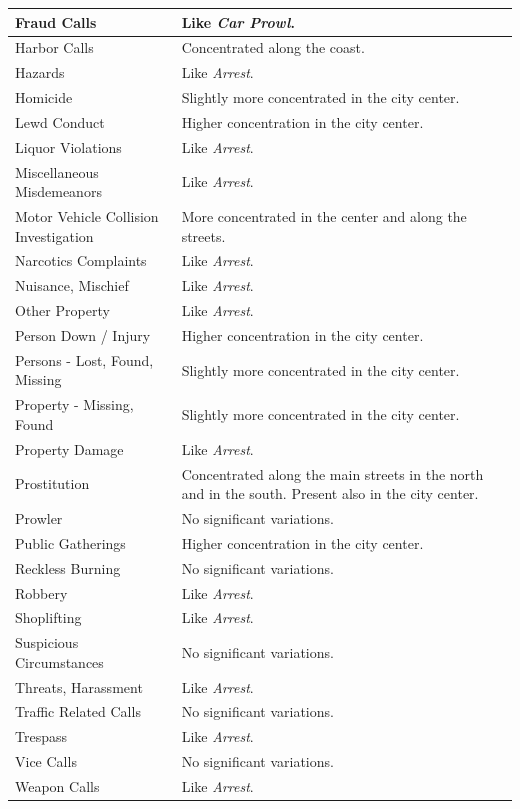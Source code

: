 \begin{longtable}{ | >{\arraybackslash} m{5cm} | >{\arraybackslash} m{10cm} | }
    \hline
    Fraud Calls             &   Like \textit{Car Prowl}. \\
    \hline
    Harbor Calls            &   Concentrated along the coast. \\
    \hline
    Hazards                 &   Like \textit{Arrest}. \\
    \hline
    Homicide                &   Slightly more concentrated in the city center. \\
    \hline
    Lewd Conduct            &   Higher concentration in the city center. \\
    \hline
    Liquor Violations       &   Like \textit{Arrest}. \\
    \hline
    Miscellaneous Misdemeanors &   Like \textit{Arrest}. \\
    \hline
    Motor Vehicle Collision Investigation &   More concentrated in the center and along the streets. \\
    \hline
    Narcotics Complaints    &   Like \textit{Arrest}. \\
    \hline
    Nuisance, Mischief      &   Like \textit{Arrest}. \\
    \hline
    Other Property          &   Like \textit{Arrest}. \\
    \hline
    Person Down / Injury    &   Higher concentration in the city center. \\
    \hline
    Persons - Lost, Found, Missing &   Slightly more concentrated in the city center. \\
    \hline
    Property - Missing, Found    &   Slightly more concentrated in the city center. \\
    \hline
    Property Damage         &   Like \textit{Arrest}. \\
    \hline
    Prostitution            &   Concentrated along the main streets in the north and in the south. Present also in the city center. \\
    \hline
    Prowler                 &   No significant variations. \\
    \hline
    Public Gatherings       &   Higher concentration in the city center. \\
    \hline
    Reckless Burning        &   No significant variations. \\
    \hline
    Robbery                 &   Like \textit{Arrest}. \\
    \hline
    Shoplifting             &   Like \textit{Arrest}. \\
    \hline
    Suspicious Circumstances &   No significant variations. \\
    \hline
    Threats, Harassment     &   Like \textit{Arrest}. \\
    \hline
    Traffic Related Calls   &   No significant variations. \\
    \hline
    Trespass                &   Like \textit{Arrest}. \\
    \hline
    Vice Calls              &   No significant variations. \\
    \hline
    Weapon Calls            &   Like \textit{Arrest}. \\
    \hline


\end{longtable}
